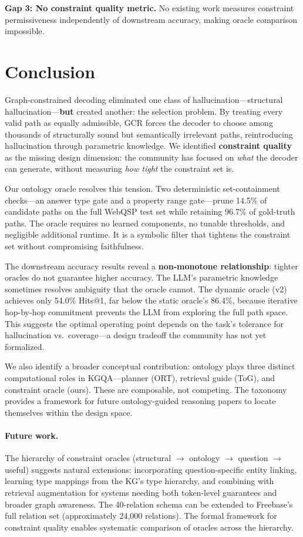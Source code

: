 \documentclass[11pt,twoside]{article}
\begin{document}
\textbf{Gap 3: No constraint quality metric.} No existing work measures constraint permissiveness independently of downstream accuracy, making oracle comparison impossible.

\section{Conclusion}
\label{sec:conclusion}

Graph-constrained decoding eliminated one class of hallucination---structural hallucination---\textbf{but} created another: the selection problem. By treating every valid path as equally admissible, GCR forces the decoder to choose among thousands of structurally sound but semantically irrelevant paths, reintroducing hallucination through parametric knowledge. We identified \textbf{constraint quality} as the missing design dimension: the community has focused on \emph{what} the decoder can generate, without measuring \emph{how tight} the constraint set is.

Our ontology oracle resolves this tension. Two deterministic set-containment checks---an answer type gate and a property range gate---prune 14.5\% of candidate paths on the full WebQSP test set while retaining 96.7\% of gold-truth paths. The oracle requires no learned components, no tunable thresholds, and negligible additional runtime. It is a symbolic filter that tightens the constraint set without compromising faithfulness.

The downstream accuracy results reveal a \textbf{non-monotone relationship}: tighter oracles do not guarantee higher accuracy. The LLM's parametric knowledge sometimes resolves ambiguity that the oracle cannot. The dynamic oracle (v2) achieves only 54.0\% Hits@1, far below the static oracle's 86.4\%, because iterative hop-by-hop commitment prevents the LLM from exploring the full path space. This suggests the optimal operating point depends on the task's tolerance for hallucination vs.\ coverage---a design tradeoff the community has not yet formalized.

We also identify a broader conceptual contribution: ontology plays three distinct computational roles in KGQA---planner (ORT), retrieval guide (ToG), and constraint oracle (ours). These are composable, not competing. The taxonomy provides a framework for future ontology-guided reasoning papers to locate themselves within the design space.

\paragraph{Future work.}
The hierarchy of constraint oracles (structural $\to$ ontology $\to$ question $\to$ useful) suggests natural extensions: incorporating question-specific entity linking, learning type mappings from the KG's type hierarchy, and combining with retrieval augmentation for systems needing both token-level guarantees and broader graph awareness. The 40-relation schema can be extended to Freebase's full relation set (approximately 24{,}000 relations). The formal framework for constraint quality enables systematic comparison of oracles across the hierarchy.
\end{document}
